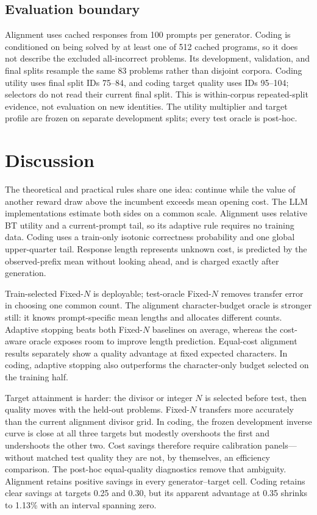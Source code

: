\subsection{Evaluation boundary}

Alignment uses cached responses from 100 prompts per generator.  Coding is
conditioned on being solved by at least one of 512 cached programs, so it does
not describe the excluded all-incorrect problems.  Its development,
validation, and final splits resample the same 83 problems rather than
disjoint corpora.  Coding utility uses final split IDs 75--84, and coding
target quality uses IDs 95--104; selectors do not read their current final
split.  This is within-corpus repeated-split evidence, not evaluation on new
identities.  The utility multiplier and target profile are frozen on separate
development splits; every test oracle is post-hoc.


\section{Discussion}

The theoretical and practical rules share one idea: continue while the value
of another reward draw above the incumbent exceeds mean opening cost.  The
LLM implementations estimate both sides on a common scale.  Alignment uses
relative BT utility and a current-prompt tail, so its adaptive rule requires
no training data.  Coding uses a train-only isotonic correctness probability
and one global upper-quarter tail.  Response length represents unknown cost,
is predicted by the observed-prefix mean without looking ahead, and is
charged exactly after generation.

Train-selected Fixed-$N$ is deployable; test-oracle Fixed-$N$ removes transfer
error in choosing one common count.  The alignment character-budget oracle is
stronger still: it knows prompt-specific mean lengths and allocates different
counts.  Adaptive stopping beats both Fixed-$N$ baselines on average, whereas
the cost-aware oracle exposes room to improve length prediction.  Equal-cost
alignment results separately show a quality advantage at fixed expected
characters.  In coding, adaptive stopping also outperforms the character-only
budget selected on the training half.

Target attainment is harder: the divisor or integer $N$ is selected before
test, then quality moves with the held-out problems.  Fixed-$N$ transfers more
accurately than the current alignment divisor grid.  In coding, the frozen
development inverse curve is close at all three targets but modestly
overshoots the first and undershoots the other two.  Cost savings therefore
require calibration panels---without matched test quality they are not, by
themselves, an efficiency comparison.  The post-hoc equal-quality diagnostics
remove that ambiguity.  Alignment retains positive savings in every
generator--target cell.  Coding retains clear savings at targets 0.25 and
0.30, but its apparent advantage at 0.35 shrinks to 1.13\% with an interval
spanning zero.

